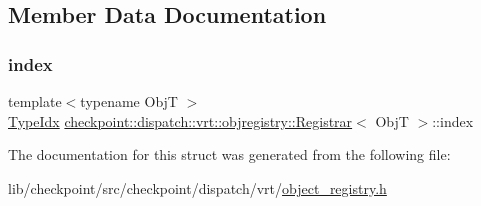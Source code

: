 \subsection{Member Data Documentation}
\mbox{\label{structcheckpoint_1_1dispatch_1_1vrt_1_1objregistry_1_1_registrar_a21eae921e8f1dbfe2ecf085912db5507}} 
\subsubsection{\texorpdfstring{index}{index}}
{\footnotesize\ttfamily template$<$typename ObjT $>$ \\
\hyperlink{namespacecheckpoint_1_1dispatch_1_1vrt_acd3f9e6b091bcfbc23dc35ea8ef45d3b}{Type\+Idx} \hyperlink{structcheckpoint_1_1dispatch_1_1vrt_1_1objregistry_1_1_registrar}{checkpoint\+::dispatch\+::vrt\+::objregistry\+::\+Registrar}$<$ ObjT $>$\+::index}



The documentation for this struct was generated from the following file\+:\begin{DoxyCompactItemize}
\item 
lib/checkpoint/src/checkpoint/dispatch/vrt/\hyperlink{object__registry_8h}{object\+\_\+registry.\+h}\end{DoxyCompactItemize}
